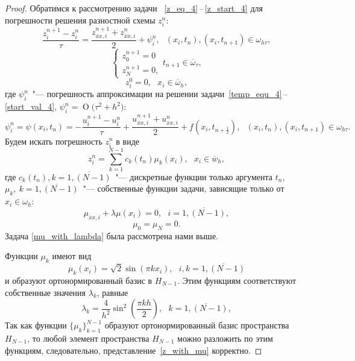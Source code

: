 \documentclass[11pt,a4paper,twoside]{report}
\numberwithin{equation}{section}
\theoremstyle{definition}
\theoremstyle{plain}
\newcommand{\bigO}[1]{\ensuremath{\operatorname{O}\bigl(#1\bigr)}}
\begin{document}
\begin{proof}
%
Обратимся к рассмотрению задачи ~\eqref{z_eq_4}\,--\,\eqref{z_start_4}
для погрешности решения разностной схемы $z_i^n$:
\begin{equation}
    \frac{z_i^{n+1} - z_i^n}{\tau} = \frac{z^{n+1}_{\overline{x}x,i} +
    z^{n}_{\overline{x}x,i}}{2} + \psi_i^n,~~~(x_i, t_n), (x_i, t_{n+1})\in \omega_{h \tau},
\end{equation}
%
\begin{equation}
    \begin{cases}
        z_0^{n+1} = 0 \\
        z_N^{n+1} = 0,
    \end{cases}
    t_{n+1}\in \overline{\omega}_{\tau},
\end{equation}
%
\begin{equation}
    z_i^0 = 0,~~~x_i\in \overline{\omega}_h,
\end{equation}
%
где $\psi_i^n$~"--- погрешность аппроксимации на решении
задачи~\eqref{temp_equ_4}\,--\,\eqref{start_val_4}, $\psi_i^n = \bigO{\tau^2 + h^2}$:
%
\begin{equation}
%
    \psi_i^n = \psi(x_i, t_n) = -\frac{u_i^{n+1} - u_i^n}{\tau} + \frac{u^{n+1}_{\overline{x}x,i}
    + u^{n}_{\overline{x}x,i}}{2} + f(x_i, t_{n+\frac{1}{2}}),
    ~~~(x_i, t_n), (x_i, t_{n+1})\in \omega_{h\tau}.
%
\end{equation}
Будем искать погрешность $z_i^n$ в виде
%
\begin{equation}
%
    \label{z_with_mu}
    z_i^n = \sum_{k=1}^{N-1} c_k(t_n)\mu_k(x_i), ~~~x_i \in \overline{w}_h,
%
\end{equation}
%
где $c_k(t_n), k=\overline{1,(N-1)}$~"--- дискретные функции только аргумента $t_n$,
$\mu_k,~k=\overline{1,(N-1)}$~"--- собственные функции задачи, зависящие только от
$x_i \in \omega_h$:
%
\begin{equation}
%
    \label{mu_with_lambda}
    \mu_{\overline{x}x,i} + \lambda \mu(x_i) = 0, ~~~i=\overline{1, (N-1)},
%
\end{equation}
%
$$
    \mu_0 = \mu_N = 0.
$$
%
Задача \eqref{mu_with_lambda} была рассмотрена нами выше.

Функции $\mu_k$ имеют вид
%
$$
    \mu_k(x_i) = \sqrt{2} \sin(\pi kx_i), ~~~i,k = \overline{1, (N-1)}
$$
%
и образуют ортонормированный базис в $H_{N-1}$.
Этим функциям соответствуют собственные значения $\lambda_k$, равные
%
$$
    \lambda_k = \frac{4}{h^2} \sin^2\left(\frac{\pi k h}{2}\right), ~~~k = \overline{1, (N-1)},
$$
%
Так как функции $\{\mu_k\}_{k=1}^{N-1}$ образуют ортонормированный базис
пространства $H_{N-1}$, то любой элемент пространства $H_{N-1}$ можно разложить
по этим функциям, следовательно, представление~\eqref{z_with_mu} корректно.


\end{proof}
\end{document}
